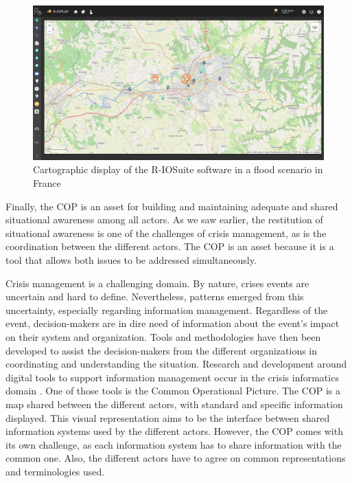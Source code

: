 \begin{figure}[htb]
    \centering
    \includegraphics[width=\textwidth]{figures/chap-1/rio.pdf}
    \caption{Cartographic display of the R-IOSuite software in a flood scenario in France\protect\footnotemark}
    \label{context:cop}
\end{figure}

Finally, the COP is an asset for building and maintaining adequate and shared situational awareness among all actors.
As we saw earlier, the restitution of situational awareness is one of the challenges of crisis management, as is the coordination between the different actors.
The COP is an asset because it is a tool that allows both issues to be addressed simultaneously.

Crisis management is a challenging domain.
By nature, crises events are uncertain and hard to define.
Nevertheless, patterns emerged from this uncertainty, especially regarding information management.
Regardless of the event, decision-makers are in dire need of information about the event's impact on their system and organization.
Tools and methodologies have then been developed to assist the decision-makers from the different organizations in coordinating and understanding the situation.
Research and development around digital tools to support information management occur in the crisis informatics domain \parencite{palenCrisisInformaticsHumancentered2020}.
One of those tools is the Common Operational Picture.
The COP is a map shared between the different actors, with standard and specific information displayed.
This visual representation aims to be the interface between shared information systems used by the different actors.
However, the COP comes with its own challenge, as each information system has to share information with the common one.
Also, the different actors have to agree on common representations and terminologies used.

